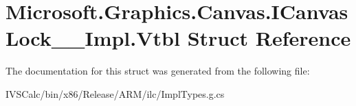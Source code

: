 \hypertarget{struct_microsoft_1_1_graphics_1_1_canvas_1_1_i_canvas_lock_____impl_1_1_vtbl}{}\section{Microsoft.\+Graphics.\+Canvas.\+I\+Canvas\+Lock\+\_\+\+\_\+\+Impl.\+Vtbl Struct Reference}
\label{struct_microsoft_1_1_graphics_1_1_canvas_1_1_i_canvas_lock_____impl_1_1_vtbl}


The documentation for this struct was generated from the following file\+:\begin{DoxyCompactItemize}
\item 
I\+V\+S\+Calc/bin/x86/\+Release/\+A\+R\+M/ilc/Impl\+Types.\+g.\+cs\end{DoxyCompactItemize}
